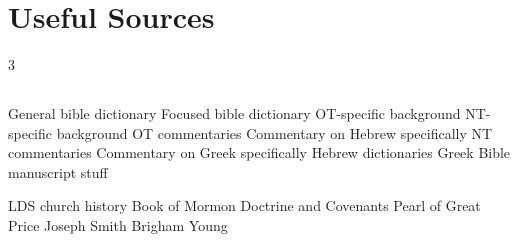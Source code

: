 \section{Useful Sources}
	\label{USEFULSOURCES}

\begin{multicols}{3}

	\scriptsize
	
	\subsection*{}
	
		General bible dictionary
		Focused bible dictionary
		OT-specific background
		NT-specific background
		OT commentaries
			Commentary on Hebrew specifically
		NT commentaries
			Commentary on Greek specifically
		Hebrew dictionaries
		Greek
		Bible manuscript stuff
		
		LDS church history
		Book of Mormon
		Doctrine and Covenants
		Pearl of Great Price
		Joseph Smith
		Brigham Young
	
	\normalsize

\end{multicols}